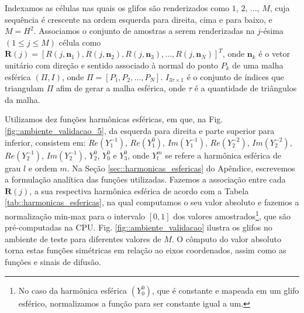\documentclass[
    12pt,                %
    oneside,            %
    a4paper,            %
    english,            %
    french,                %
    spanish,            %
    brazil                %
    ]{abntex2}
\begin{document}
Indexamos as células nas quais os glifos são renderizados como $1$, $2$, ..., $M$, cuja sequência é crescente na ordem esquerda para direita, cima e para baixo, e $M = H^2$. Associamos o conjunto de amostras a serem renderizadas na $j$-ésima $(1 \leq j \leq M)$ célula como $\boldsymbol{R}(j) = [
R(j, \mathbf{n}_1), 
R(j, \mathbf{n}_2), 
R(j, \mathbf{n}_3), ..., 
R(j, \mathbf{n}_N)
]^T$, onde $\mathbf{n}_k$ é o vetor unitário com direção e sentido associado à normal do ponto $P_k$ de uma malha esférica $(\Pi, I)$, onde $\Pi = [P_1, P_2, \dots, P_N]$. $I_{3\tau \times 1}$ é o conjunto de índices que triangulam $\Pi$ afim de gerar a malha esférica, onde $\tau$ é a quantidade de triângulos da malha.%

Utilizamos dez funções harmônicas esféricas, em que, na Fig. \ref{fig::ambiente_validacao_5}, da esquerda para direita e parte superior para inferior, consistem em: $Re(Y_1^{-1})$,
$Re(Y_1^0)$,
$Im(Y_1^{-1})$,
$Re(Y_2^{-2})$,
$Im(Y_2^{-2})$,
$Re(Y_2^{-1})$,
$Im(Y_2^{-1})$,
$Y_2^0$,
$Y_0^0$ e
$Y_3^0$, onde $Y_l^m$ se refere a harmônica esférica de grau $l$ e ordem $m$. Na Seção \ref{sec::harmonicas_esfericas} do Apêndice, escrevemos a formulação analítica das funções utilizadas. Fazemos a associação entre cada $\boldsymbol{R}(j)$, a sua respectiva harmônica esférica de acordo com a Tabela \ref{tab::harmonicas_esfericas}, na qual computamos o seu valor absoluto e fazemos a normalização min-max para o intervalo $[0, 1]$ dos valores amostrados\footnote{No caso da harmônica esférica $(Y_0^0)$, que é constante e mapeada em um glifo esférico, normalizamos a função para ser constante igual a um.}, que são pré-computadas na CPU. Fig. \ref{fig::ambiente_validacao} ilustra os glifos no ambiente de teste para diferentes valores de $M$. O cômputo do valor absoluto torna estas funções simétricas em relação ao eixos coordenados, assim como as funções e sinais de difusão.
\end{document}
